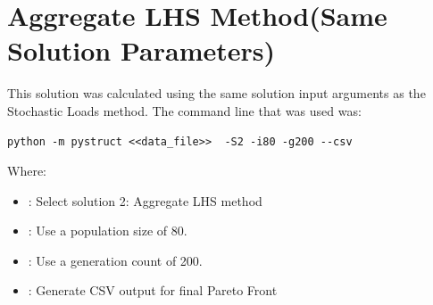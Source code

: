 \section{Aggregate LHS Method(Same Solution Parameters)}

This solution was calculated using the same solution input arguments as the Stochastic Loads method. The command line that was used was:

\begin{verbatim}
python -m pystruct <<data_file>>  -S2 -i80 -g200 --csv
\end{verbatim}

\noindent Where: 

\begin{itemize}
  \item {}: Select solution 2: Aggregate LHS method
  \item {}: Use a population size of 80. 
  \item {}: Use a generation count of 200. 
  \item {}: Generate CSV output for final Pareto Front
\end{itemize}

